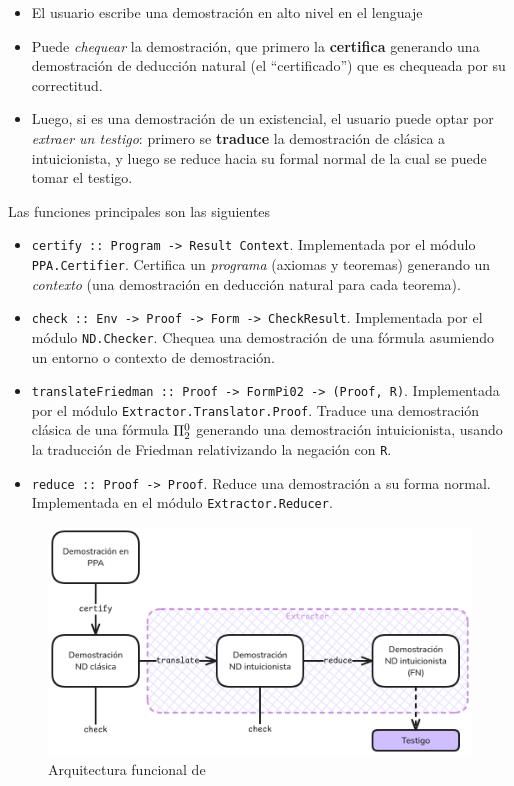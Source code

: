 \begin{itemize}
    \item El usuario escribe una demostración en alto nivel en el lenguaje \ppaLang{}
    \item Puede \textit{chequear} la demostración, que primero la \textbf{certifica} generando una demostración de deducción natural (el ``certificado'') que es chequeada por su correctitud.
    \item Luego, si es una demostración de un existencial, el usuario puede optar por \textit{extraer un testigo}: primero se \textbf{traduce} la demostración de clásica a intuicionista, y luego se reduce hacia su formal normal de la cual se puede tomar el testigo.
\end{itemize}

Las funciones principales son las siguientes

\begin{itemize}
    \item \texttt{certify :: Program -> Result Context}. Implementada por el módulo \texttt{PPA.Certifier}. Certifica un \textit{programa} (axiomas y teoremas) generando un \textit{contexto} (una demostración en deducción natural para cada teorema).
    \item \texttt{check :: Env -> Proof -> Form -> CheckResult}.
    Implementada por el módulo \texttt{ND.Checker}. Chequea una demostración de una fórmula asumiendo un entorno o contexto de demostración.
    \item \texttt{translateFriedman :: Proof -> FormPi02 -> (Proof, R)}. Implementada por el módulo \texttt{Extractor.Translator.Proof}. Traduce una demostración clásica de una fórmula $\Pi^0_{2}$ generando una demostración intuicionista, usando la traducción de Friedman relativizando la negación con \texttt{R}.
    \item \texttt{reduce :: Proof -> Proof}. Reduce una demostración a su forma normal. Implementada en el módulo \texttt{Extractor.Reducer}.
\end{itemize}

\begin{figure}[h]
    \includegraphics[scale=0.42]{img/arch.png}
    \centering
    \caption{Arquitectura funcional de \ppaTool{}}
    \label{intro:fig:ppa-arch}
\end{figure}

